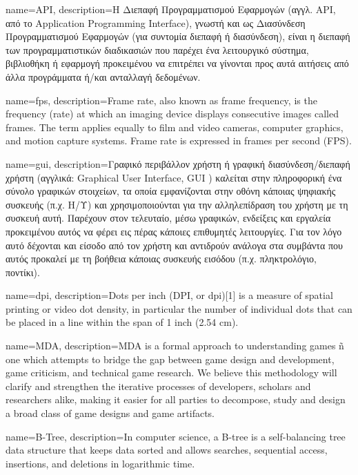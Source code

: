 {
	name=API,
	description={H Διεπαφή Προγραμματισμού Εφαρμογών (αγγλ. API, από το Application Programming Interface), γνωστή και ως Διασύνδεση Προγραμματισμού Εφαρμογών (για συντομία διεπαφή ή διασύνδεση), είναι η διεπαφή των προγραμματιστικών διαδικασιών που παρέχει ένα λειτουργικό σύστημα, βιβλιοθήκη ή εφαρμογή προκειμένου να επιτρέπει να γίνονται προς αυτά αιτήσεις από άλλα προγράμματα ή/και ανταλλαγή δεδομένων.}
}

{
	name={fps},
	description={Frame rate, also known as frame frequency, is the frequency (rate) at which an imaging device displays consecutive images called frames. The term applies equally to film and video cameras, computer graphics, and motion capture systems. Frame rate is expressed in frames per second (FPS).}
}

{
	name={gui},
	description={Γραφικό περιβάλλον χρήστη ή γραφική διασύνδεση/διεπαφή χρήστη (αγγλικά: Graphical User Interface, GUI ) καλείται στην πληροφορική ένα σύνολο γραφικών στοιχείων, τα οποία εμφανίζονται στην οθόνη κάποιας ψηφιακής συσκευής (π.χ. Η/Υ) και χρησιμοποιούνται για την αλληλεπίδραση του χρήστη με τη συσκευή αυτή. Παρέχουν στον τελευταίο, μέσω γραφικών, ενδείξεις και εργαλεία προκειμένου αυτός να φέρει εις πέρας κάποιες επιθυμητές λειτουργίες. Για τον λόγο αυτό δέχονται και είσοδο από τον χρήστη και αντιδρούν ανάλογα στα συμβάντα που αυτός προκαλεί με τη βοήθεια κάποιας συσκευής εισόδου (π.χ. πληκτρολόγιο, ποντίκι).}		
}

{
	name={dpi},
	description={Dots per inch (DPI, or dpi)[1] is a measure of spatial printing or video dot density, in particular the number of individual dots that can be placed in a line within the span of 1 inch (2.54 cm).}
}

{
	name={MDA},
	description={MDA is a formal approach to understanding games ñ one
		which attempts to bridge the gap between game design and
		development, game criticism, and technical game research.
		We believe this methodology will clarify and strengthen the
		iterative processes of developers, scholars and researchers
		alike, making it easier for all parties to decompose, study
		and design a broad class of game designs and game
		artifacts. }	
}

{name={B-Tree},
	description={In computer science, a B-tree is a self-balancing tree data structure that keeps data sorted and allows searches, sequential access, insertions, and deletions in logarithmic time. }
}